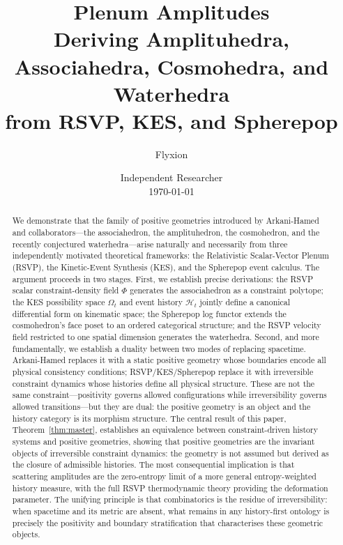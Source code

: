 \documentclass[11pt]{article}
\title{\textbf{Plenum Amplitudes}\\[0.6em]
\large Deriving Amplituhedra, Associahedra, Cosmohedra, and Waterhedra\\
from RSVP, KES, and Spherepop}
\author{Flyxion}
\date{Independent Researcher\\[0.4em] \today}
\theoremstyle{plain}
\theoremstyle{definition}
\theoremstyle{remark}
\newcommand{\Phif}{\Phi}
\newcommand{\OmKS}{\Omega}
\newcommand{\HKS}{\mathcal{H}}
\begin{document}
\maketitle
\makeatletter
\def\@oddhead{}
\def\@evenhead{}
\makeatother
\pagestyle{plain}
\thispagestyle{plain}

\begin{abstract}
We demonstrate that the family of positive geometries introduced by Arkani-Hamed and collaborators---the associahedron, the amplituhedron, the cosmohedron, and the recently conjectured waterhedra---arise naturally and necessarily from three independently motivated theoretical frameworks: the Relativistic Scalar-Vector Plenum (RSVP), the Kinetic-Event Synthesis (KES), and the Spherepop event calculus. The argument proceeds in two stages. First, we establish precise derivations: the RSVP scalar constraint-density field $\Phif$ generates the associahedron as a constraint polytope; the KES possibility space $\OmKS_t$ and event history $\HKS_t$ jointly define a canonical differential form on kinematic space; the Spherepop log functor extends the cosmohedron's face poset to an ordered categorical structure; and the RSVP velocity field restricted to one spatial dimension generates the waterhedra. Second, and more fundamentally, we establish a duality between two modes of replacing spacetime. Arkani-Hamed replaces it with a static positive geometry whose boundaries encode all physical consistency conditions; RSVP/KES/Spherepop replace it with irreversible constraint dynamics whose histories define all physical structure. These are not the same constraint---positivity governs allowed configurations while irreversibility governs allowed transitions---but they are dual: the positive geometry is an object and the history category is its morphism structure. The central result of this paper, Theorem~\ref{thm:master}, establishes an equivalence between constraint-driven history systems and positive geometries, showing that positive geometries are the invariant objects of irreversible constraint dynamics: the geometry is not assumed but derived as the closure of admissible histories. The most consequential implication is that scattering amplitudes are the zero-entropy limit of a more general entropy-weighted history measure, with the full RSVP thermodynamic theory providing the deformation parameter. The unifying principle is that combinatorics is the residue of irreversibility: when spacetime and its metric are absent, what remains in any history-first ontology is precisely the positivity and boundary stratification that characterises these geometric objects.
\end{abstract}
\end{document}
